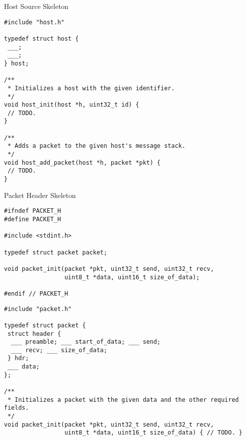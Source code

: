 \begin{cl}[host.c]{Host Source Skeleton}
\begin{lstlisting}[language=MyC]
#include "host.h"

typedef struct host {
 ___;
 ___;
} host;

/**
 * Initializes a host with the given identifier.
 */
void host_init(host *h, uint32_t id) {
 // TODO.
}

/**
 * Adds a packet to the given host's message stack.
 */
void host_add_packet(host *h, packet *pkt) {
 // TODO.
}
\end{lstlisting}
\end{cl}


\begin{cl}[packet.h]{Packet Header Skeleton}
\begin{lstlisting}[language=MyC]
#ifndef PACKET_H
#define PACKET_H

#include <stdint.h>

typedef struct packet packet;

void packet_init(packet *pkt, uint32_t send, uint32_t recv, 
                 uint8_t *data, uint16_t size_of_data);

#endif // PACKET_H
\end{lstlisting}
\end{cl}

\begin{cl}[packet.c]{}
\begin{lstlisting}[language=MyC]
#include "packet.h"

typedef struct packet {
 struct header {
  ___ preamble; ___ start_of_data; ___ send; 
  ___ recv; ___ size_of_data; 
 } hdr;
 ___ data;
};

/**
 * Initializes a packet with the given data and the other required fields.
 */
void packet_init(packet *pkt, uint32_t send, uint32_t recv, 
                 uint8_t *data, uint16_t size_of_data) { // TODO. }
\end{lstlisting}
\end{cl}

